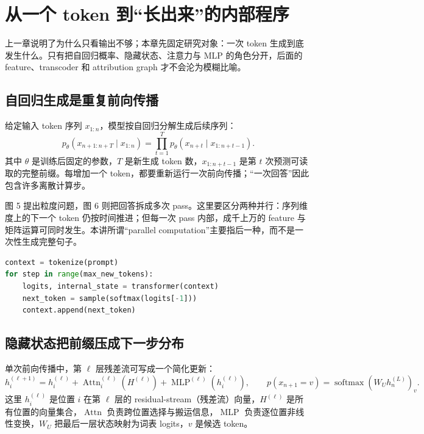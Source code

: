 \section{从一个 token 到“长出来”的内部程序}

上一章说明了为什么只看输出不够；本章先固定研究对象：一次 token 生成到底发生什么。只有把自回归概率、隐藏状态、注意力与 MLP 的角色分开，后面的 feature、transcoder 和 attribution graph 才不会沦为模糊比喻。

\subsection{自回归生成是重复前向传播}

给定输入 token 序列 $x_{1:n}$，模型按自回归分解生成后续序列：
\[
p_\theta(x_{n+1:n+T}\mid x_{1:n})
=\prod_{t=1}^{T}p_\theta(x_{n+t}\mid x_{1:n+t-1}).
\]
其中 $\theta$ 是训练后固定的参数，$T$ 是新生成 token 数，$x_{1:n+t-1}$ 是第 $t$ 次预测可读取的完整前缀。每增加一个 token，都要重新运行一次前向传播；“一次回答”因此包含许多离散计算步。



图 5 提出粒度问题，图 6 则把回答拆成多次 pass。这里要区分两种并行：序列维度上的下一个 token 仍按时间推进；但每一次 pass 内部，成千上万的 feature 与矩阵运算可同时发生。本讲所谓“parallel computation”主要指后一种，而不是一次性生成完整句子。

\begin{lstlisting}[language=Python,caption={自回归解码的最小伪代码：每个 token 对应一次新的前向传播}]
context = tokenize(prompt)
for step in range(max_new_tokens):
    logits, internal_state = transformer(context)
    next_token = sample(softmax(logits[-1]))
    context.append(next_token)
\end{lstlisting}

\subsection{隐藏状态把前缀压成下一步分布}

单次前向传播中，第 $\ell$ 层残差流可写成一个简化更新：
\[
h_i^{(\ell+1)}=h_i^{(\ell)}
+\operatorname{Attn}^{(\ell)}_i(H^{(\ell)})
+\operatorname{MLP}^{(\ell)}(h_i^{(\ell)}),
\qquad
p(x_{n+1}=v)=\operatorname{softmax}(W_U h_n^{(L)})_v.
\]
这里 $h_i^{(\ell)}$ 是位置 $i$ 在第 $\ell$ 层的 residual-stream（残差流）向量，$H^{(\ell)}$ 是所有位置的向量集合，$\operatorname{Attn}$ 负责跨位置选择与搬运信息，$\operatorname{MLP}$ 负责逐位置非线性变换，$W_U$ 把最后一层状态映射为词表 logits，$v$ 是候选 token。

